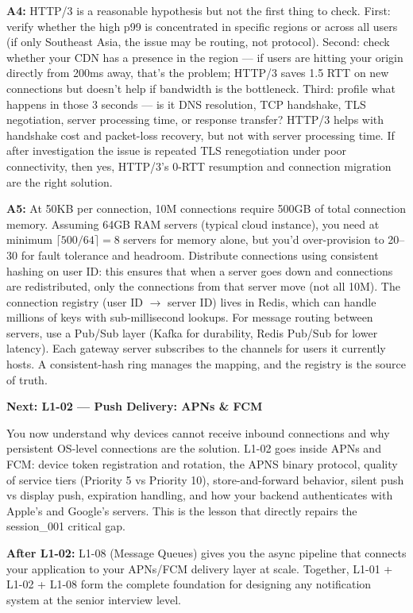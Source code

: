 \documentclass[11pt,a4paper]{article}
\begin{document}
\begin{answerbox}
\vspace{8pt}

\textbf{A4:} HTTP/3 is a reasonable hypothesis but not the first thing to check. First: verify whether the high p99 is concentrated in specific regions or across all users (if only Southeast Asia, the issue may be routing, not protocol). Second: check whether your CDN has a presence in the region --- if users are hitting your origin directly from 200ms away, that's the problem; HTTP/3 saves 1.5 RTT on new connections but doesn't help if bandwidth is the bottleneck. Third: profile what happens in those 3 seconds --- is it DNS resolution, TCP handshake, TLS negotiation, server processing time, or response transfer? HTTP/3 helps with handshake cost and packet-loss recovery, but not with server processing time. If after investigation the issue is repeated TLS renegotiation under poor connectivity, then yes, HTTP/3's 0-RTT resumption and connection migration are the right solution.

\vspace{8pt}

\textbf{A5:} At 50KB per connection, 10M connections require 500GB of total connection memory. Assuming 64GB RAM servers (typical cloud instance), you need at minimum $\lceil 500/64 \rceil = 8$ servers for memory alone, but you'd over-provision to 20--30 for fault tolerance and headroom. Distribute connections using consistent hashing on user ID: this ensures that when a server goes down and connections are redistributed, only the connections from that server move (not all 10M). The connection registry (user ID $\to$ server ID) lives in Redis, which can handle millions of keys with sub-millisecond lookups. For message routing between servers, use a Pub/Sub layer (Kafka for durability, Redis Pub/Sub for lower latency). Each gateway server subscribes to the channels for users it currently hosts. A consistent-hash ring manages the mapping, and the registry is the source of truth.
\end{answerbox}

\vspace{16pt}
\begin{insightbox}
\textbf{Next: L1-02 --- Push Delivery: APNs \& FCM}

You now understand why devices cannot receive inbound connections and why persistent OS-level connections are the solution. L1-02 goes inside APNs and FCM: device token registration and rotation, the APNS binary protocol, quality of service tiers (Priority 5 vs Priority 10), store-and-forward behavior, silent push vs display push, expiration handling, and how your backend authenticates with Apple's and Google's servers. This is the lesson that directly repairs the session\_001 critical gap.

\textbf{After L1-02:} L1-08 (Message Queues) gives you the async pipeline that connects your application to your APNs/FCM delivery layer at scale. Together, L1-01 + L1-02 + L1-08 form the complete foundation for designing any notification system at the senior interview level.
\end{insightbox}
\end{document}
